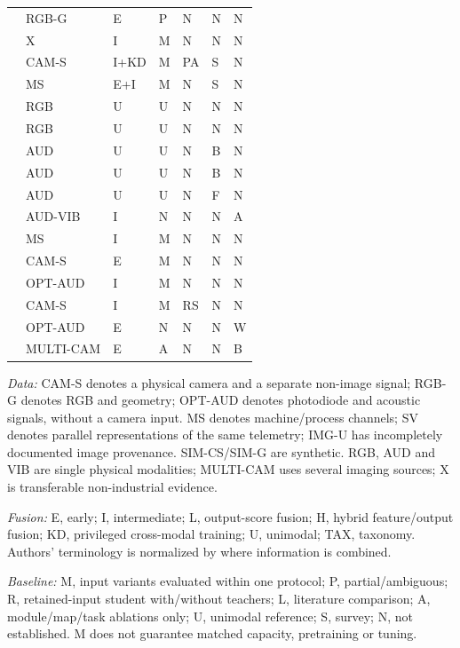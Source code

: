 \begin{longtable}{@{}p{}llllll@{}}
\citep{Bergmann2022The} & RGB-G & E & P & N & N & N \\
\citep{Wang2020What} & X & I & M & N & N & N \\
\citep{Xie2025Audiovisual} & CAM-S & I+KD & M & PA & S & N \\
\citep{Goodarzi2023Deep} & MS & E+I & M & N & S & N \\
\citep{Roth2022Towards} & RGB & U & U & N & N & N \\
\citep{Bergmann2019MVTec} & RGB & U & U & N & N & N \\
\citep{Purohit2019MIMII} & AUD & U & U & N & B & N \\
\citep{Koizumi2019ToyADMOS} & AUD & U & U & N & B & N \\
\citep{Koizumi2020Description} & AUD & U & U & N & F & N \\
\citep{Chu2024A} & AUD-VIB & I & N & N & N & A \\
\citep{Kullu2022A} & MS & I & M & N & N & N \\
\citep{Chen2023Multisensor} & CAM-S & E & M & N & N & N \\
\citep{Li2022A} & OPT-AUD & I & M & N & N & N \\
\citep{Petrich2021Multimodal} & CAM-S & I & M & RS & N & N \\
\citep{Pandiyan2022Deep} & OPT-AUD & E & N & N & N & W \\
\citep{Bevans2023Heterogeneous} & MULTI-CAM & E & A & N & N & B \\
\bottomrule
\end{longtable}
\noindent\textit{Data:} CAM-S denotes a physical camera and a separate non-image signal; RGB-G denotes RGB and geometry; OPT-AUD denotes photodiode and acoustic signals, without a camera input. MS denotes machine/process channels; SV denotes parallel representations of the same telemetry; IMG-U has incompletely documented image provenance. SIM-CS/SIM-G are synthetic. RGB, AUD and VIB are single physical modalities; MULTI-CAM uses several imaging sources; X is transferable non-industrial evidence.
\par\noindent\textit{Fusion:} E, early; I, intermediate; L, output-score fusion; H, hybrid feature/output fusion; KD, privileged cross-modal training; U, unimodal; TAX, taxonomy. Authors' terminology is normalized by where information is combined.
\par\noindent\textit{Baseline:} M, input variants evaluated within one protocol; P, partial/ambiguous; R, retained-input student with/without teachers; L, literature comparison; A, module/map/task ablations only; U, unimodal reference; S, survey; N, not established. M does not guarantee matched capacity, pretraining or tuning.
